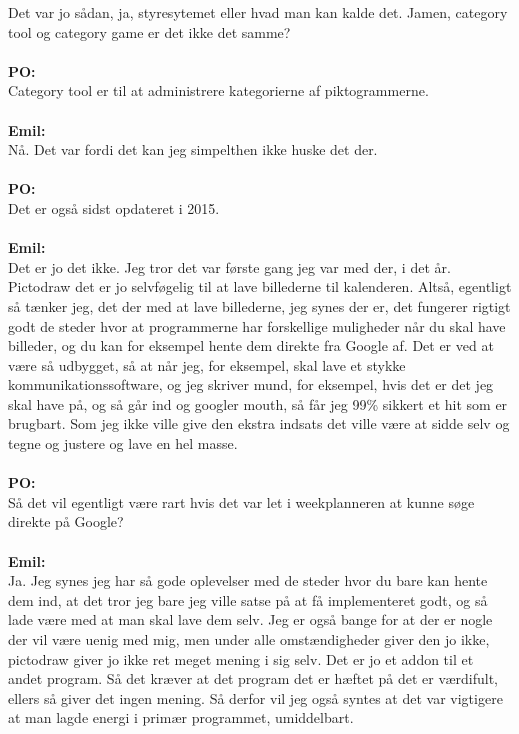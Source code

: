 Det var jo sådan, ja, styresytemet eller hvad man kan kalde det.
Jamen, category tool og category game er det ikke det samme? 
\\\\
\textbf{PO:}\\
Category tool er til at administrere kategorierne af piktogrammerne.
\\\\
\textbf{Emil:}\\
Nå.
Det var fordi det kan jeg simpelthen ikke huske det der.
\\\\
\textbf{PO:}\\
Det er også sidst opdateret i 2015.
\\\\
\textbf{Emil:}\\
Det er jo det ikke.
Jeg tror det var første gang jeg var med der, i det år.
Pictodraw det er jo selvføgelig til at lave billederne til kalenderen.
Altså, egentligt så tænker jeg, det der med at lave billederne, jeg synes der er, det fungerer rigtigt godt de steder hvor at programmerne har forskellige muligheder når du skal have billeder, og du kan for eksempel hente dem direkte fra Google af.
Det er ved at være så udbygget, så at når jeg, for eksempel, skal lave et stykke kommunikationssoftware, og jeg skriver mund, for eksempel, hvis det er det jeg skal have på, og så går ind og googler mouth, så får jeg 99\% sikkert et hit som er brugbart.
Som jeg ikke ville give den ekstra indsats det ville være at sidde selv og tegne og justere og lave en hel masse.
\\\\
\textbf{PO:}\\
Så det vil egentligt være rart hvis det var let i weekplanneren at kunne søge direkte på Google?
\\\\
\textbf{Emil:}\\
Ja.
Jeg synes jeg har så gode oplevelser med de steder hvor du bare kan hente dem ind, at det tror jeg bare jeg ville satse på at få implementeret godt, og så lade være med at man skal lave dem selv.
Jeg er også bange for at der er nogle der vil være uenig med mig, men under alle omstændigheder giver den jo ikke, pictodraw giver jo ikke ret meget mening i sig selv.
Det er jo et addon til et andet program.
Så det kræver at det program det er hæftet på det er værdifult, ellers så giver det ingen mening.
Så derfor vil jeg også syntes at det var vigtigere at man lagde energi i primær programmet, umiddelbart.
